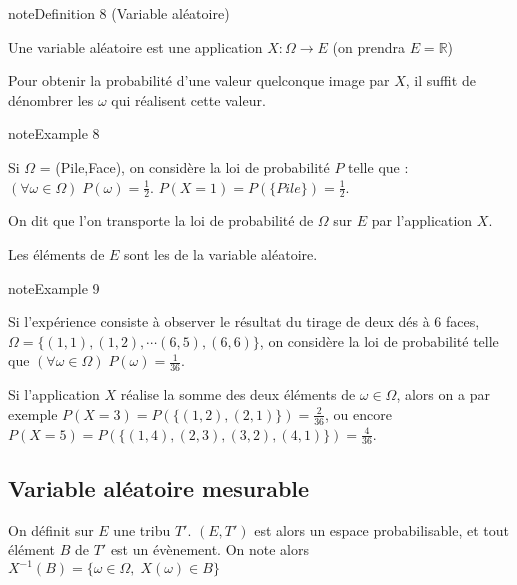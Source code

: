 \documentclass[letterpaper,10pt,french]{sphinxmanual}
\begin{document}
\ignorespaces \label{Rappels:definition-18}
\begin{sphinxadmonition}{note}{Definition 8 (Variable aléatoire)}



\sphinxAtStartPar
Une variable aléatoire est une application \(X:\Omega\rightarrow E\) (on prendra \(E=\mathbb R\))
\end{sphinxadmonition}

\sphinxAtStartPar
Pour obtenir la probabilité d’une valeur quelconque image par \(X\), il suffit de dénombrer les \(\omega\) qui réalisent cette valeur.
\label{Rappels:example-19}
\begin{sphinxadmonition}{note}{Example 8}



\sphinxAtStartPar
Si \(\Omega\) = (Pile,Face), on considère la loi de probabilité \(P\) telle que : \((\forall \omega\in\Omega)\; P(\omega)=\frac12\).
\(P(X=1)= P(\{Pile\}) = \frac12\).
\end{sphinxadmonition}

\sphinxAtStartPar
On dit que l’on transporte la loi de probabilité de \(\Omega\) sur \(E\) par l’application \(X\).

\sphinxAtStartPar
Les éléments de \(E\) sont les  de la variable aléatoire.
\label{Rappels:example-20}
\begin{sphinxadmonition}{note}{Example 9}



\sphinxAtStartPar
Si l’expérience consiste à observer le résultat du tirage de deux dés à 6 faces, \(\Omega = \{(1,1), (1,2), \cdots (6,5), (6,6)\}\), on considère la loi de probabilité telle que \((\forall \omega\in\Omega)\; P(\omega)=\frac{1}{36}\).

\sphinxAtStartPar
Si l’application \(X\) réalise la somme des deux éléments de \(\omega\in\Omega\), alors on a par exemple \(P(X=3)= P(\{(1,2),(2,1)\}) = \frac{2}{36}\), ou encore \(P(X=5)= P(\{(1,4),(2,3),(3,2),(4,1)\}) = \frac{4}{36}\).
\end{sphinxadmonition}


\subsection{Variable aléatoire mesurable}
\label{\detokenize{Rappels:variable-aleatoire-mesurable}}
\sphinxAtStartPar
On définit sur \(E\) une tribu \(T'\).  \((E,T')\) est alors un espace probabilisable, et tout élément \(B\) de \(T'\) est un évènement. On note alors \(X^{-1}(B) = \{\omega\in\Omega,\; X(\omega)\in B\}\)
\end{document}
